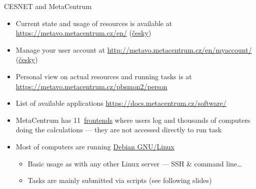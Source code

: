 \documentclass[compress, xelatex, 11pt, xcolor=svgnames, aspectratio=169,
	hyperref={
		bookmarks=true,
		unicode=true,
		colorlinks=true,
		pdftitle={Linux, command line and MetaCentrum},
		plainpages=false,
		pdfauthor={Vojtech Zeisek},
		pdfsubject={Course about use of Linux command line, writing shell scripts and using MetaCentrum of CESNET},
		pdfcreator={XeLaTeX},
		pdfkeywords={Linux, GNU, BASH, shell, command line, MetaCentrum},
		linkcolor=DarkRed, %
		anchorcolor=DarkBlue, %
		citecolor=Indigo, %
		filecolor=NavyBlue, %
		menucolor=DarkMagenta, %
		urlcolor=DarkBlue, %
		},
	url={hyphens, lowtilde} %
	]{beamer}
\begin{document}
\begin{frame}[allowframebreaks]{CESNET and MetaCentrum}
\begin{itemize}
		\item Current state and usage of resources is available at \url{https://metavo.metacentrum.cz/en/} (\href{https://metavo.metacentrum.cz/cs/}{česky})
		\item Manage your user account at \url{http://metavo.metacentrum.cz/en/myaccount/} (\href{https://metavo.metacentrum.cz/cs/myaccount/}{česky})
		\item Personal view on actual resources and running tasks is at \url{https://metavo.metacentrum.cz/pbsmon2/person}
		\item List of available applications \url{https://docs.metacentrum.cz/software/}
		\item MetaCentrum has 11~\href{https://docs.metacentrum.cz/computing/frontends/}{frontends} where users log and thousands of computers doing the calculations --- they are not accessed directly to run task
		\item Most of computers are running \href{https://www.debian.org/}{Debian GNU/Linux}
		\begin{itemize}
			\item Basic usage as with any other Linux server --- SSH \& command line\ldots
			\item Tasks are mainly submitted via scripts (see following slides)
		\end{itemize}
	\end{itemize}
\end{frame}
\end{document}
